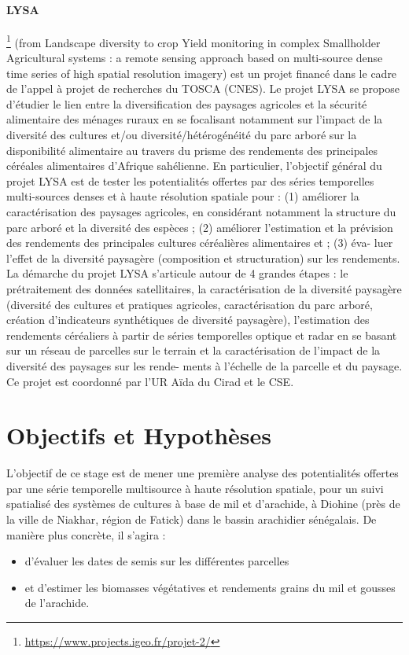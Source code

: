   \paragraph{LYSA}\footnote{\url{https://www.projects.igeo.fr/projet-2/}} (from Landscape diversity to crop Yield monitoring in complex Smallholder
Agricultural systems : a remote sensing approach based on multi-source dense time
series of high spatial resolution imagery) est un projet financé dans le cadre de l’appel
à projet de recherches du TOSCA (CNES). Le projet LYSA se propose d’étudier le lien
entre la diversification des paysages agricoles et la sécurité alimentaire des ménages
ruraux en se focalisant notamment sur l’impact de la diversité des cultures et/ou
diversité/hétérogénéité du parc arboré sur la disponibilité alimentaire au travers du
prisme des rendements des principales céréales alimentaires d’Afrique sahélienne.
En particulier, l’objectif général du projet LYSA est de tester les potentialités offertes
par des séries temporelles multi-sources denses et à haute résolution spatiale pour :
(1) améliorer la caractérisation des paysages agricoles, en considérant notamment la
structure du parc arboré et la diversité des espèces ; (2) améliorer l’estimation et la
prévision des rendements des principales cultures céréalières alimentaires et ; (3) éva-
luer l’effet de la diversité paysagère (composition et structuration) sur les rendements.
La démarche du projet LYSA s’articule autour de 4 grandes étapes : le prétraitement
des données satellitaires, la caractérisation de la diversité paysagère (diversité des
cultures et pratiques agricoles, caractérisation du parc arboré, création d’indicateurs
synthétiques de diversité paysagère), l’estimation des rendements céréaliers à partir de séries temporelles optique et radar en se basant sur un réseau de parcelles sur
le terrain et la caractérisation de l’impact de la diversité des paysages sur les rende-
ments à l’échelle de la parcelle et du paysage. Ce projet est coordonné par l’UR Aïda
du Cirad et le CSE.

\section{Objectifs et Hypothèses}

L'objectif de ce stage est de mener une première analyse des potentialités offertes par une série temporelle multisource à haute résolution spatiale, pour un suivi spatialisé des systèmes de cultures à base de mil et d’arachide, à Diohine (près de la ville
de Niakhar, région de Fatick) dans le bassin arachidier sénégalais. De manière plus concrète, il s'agira :
  \begin{itemize}
   \item d'évaluer les dates de semis sur les différentes parcelles
   \item et d’estimer les biomasses végétatives et rendements grains du mil et gousses
de l’arachide.
  \end{itemize}
 
